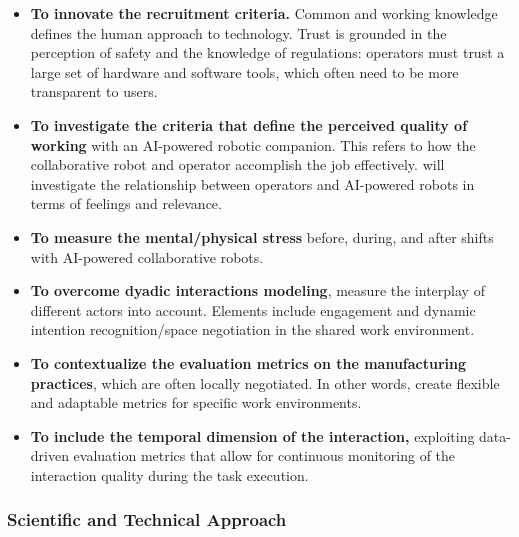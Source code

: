 \begin{itemize}
\item
  \textbf{To innovate the recruitment criteria.} Common and working
  knowledge defines the human approach to technology. Trust is grounded
  in the perception of safety and the knowledge of regulations:
  operators must trust a large set of hardware and software tools, which
  often need to be more transparent to users.
\item
  \textbf{To investigate the criteria that define the perceived quality
  of working} with an AI-powered robotic companion. This refers to how
  the collaborative robot and operator accomplish the job effectively.
   will investigate the relationship between operators
  and AI-powered robots in terms of feelings and relevance.
\item
  \textbf{To measure the mental/physical stress} before, during, and
  after shifts with AI-powered collaborative robots.
\item
  \textbf{To overcome dyadic interactions modeling}, measure the
  interplay of different actors into account. Elements include
  engagement and dynamic intention recognition/space negotiation in the
  shared work environment.
\item
  \textbf{To contextualize the evaluation metrics on the manufacturing
  practices}, which are often locally negotiated. In other words, create
  flexible and adaptable metrics for specific work environments.
\item
  \textbf{To include the temporal dimension of the interaction,}
  exploiting data-driven evaluation metrics that allow for continuous
  monitoring of the interaction quality during the task execution.
\end{itemize}

\subsubsection{Scientific and Technical
Approach}\label{scientific-and-technical-approach-3}

